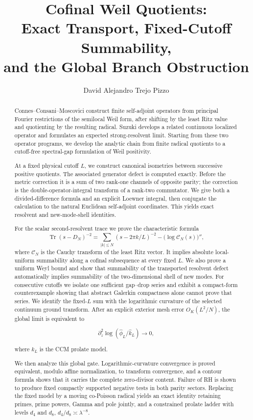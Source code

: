 \documentclass[11pt]{amsart}
\title[Cofinal Weil quotients]
{Cofinal Weil Quotients:\\
Exact Transport, Fixed-Cutoff Summability,\\
and the Global Branch Obstruction}
\author{David Alejandro Trejo Pizzo}
\theoremstyle{definition}
\theoremstyle{remark}
\newcommand{\Tr}{\operatorname{Tr}}
\begin{document}
\begin{abstract}
Connes--Consani--Moscovici construct finite self-adjoint operators from
principal Fourier restrictions of the semilocal Weil form, after shifting by
the least Ritz value and quotienting by the resulting radical.  Suzuki
develops a related continuous localized operator and formulates an expected
strong-resolvent limit.  Starting from these two operator programs, we
develop the analytic chain from finite radical quotients to a cutoff-free
spectral-gap formulation of Weil positivity.

At a fixed physical cutoff \(L\), we construct canonical isometries between
successive positive quotients.  The associated generator defect is computed
exactly.  Before the metric correction it is a sum of two rank-one channels
of opposite parity; the correction is the double-operator-integral transform
of a rank-two commutator.  We give both a divided-difference formula and an
explicit Loewner integral, then conjugate the calculation to the natural
Euclidean self-adjoint coordinates.  This yields exact resolvent and
new-mode-shell identities.

For the scalar second-resolvent trace we prove the characteristic formula
\[
 \Tr(s-D_N)^{-2}
 =\sum_{|k|\le N}(s-2\pi k/L)^{-2}
  -\bigl(\log\mathcal C_N(s)\bigr)'',
\]
where \(\mathcal C_N\) is the Cauchy transform of the least Ritz vector.  It
implies absolute local-uniform summability along a cofinal subsequence at
every fixed \(L\).  We also prove a uniform Weyl bound and show that
summability of the transported resolvent defect automatically implies
summability of the two-dimensional shell of new modes.  For consecutive
cutoffs we isolate one sufficient gap--drop series and exhibit a compact-form
counterexample showing that abstract Galerkin compactness alone cannot prove
that series.  We identify the fixed-\(L\) sum with the logarithmic curvature
of the selected continuum ground transform.  After an explicit exterior
mesh error \(O_K(L^2/N)\), the global limit is equivalent to

\[
 \partial_z^2\log(\widehat\phi_L/\widehat k_L)\longrightarrow0,
\]

where \(k_L\) is the CCM prolate model.

We then analyze this global gate.  Logarithmic-curvature convergence is
proved equivalent, modulo affine normalization, to transform convergence,
and a contour formula shows that it carries the complete zero-divisor
content.  Failure of RH is shown to produce fixed compactly supported
negative tests in both parity sectors.  Replacing the fixed model by a
moving co-Poisson radical yields an exact identity retaining primes, prime
powers, Gamma and pole jointly, and a constrained prolate ladder with
levels \(d_4\) and \(d_8\), \(d_4/d_8\asymp\lambda^{-8}\).


\end{abstract}
\end{document}
